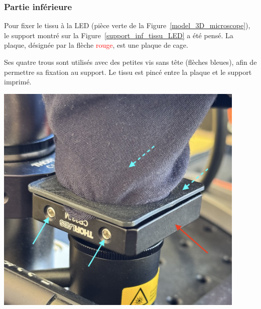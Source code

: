 \subsubsection{Partie inférieure}
\begin{minipage}[c]{0.48\textwidth}
    Pour fixer le tissu à la LED (pièce \textcolor[RGB]{70, 170, 70}{verte} de la Figure~\ref{model_3D_microscope}), le support montré sur la Figure~\ref{support_inf_tissu_LED} a été pensé. La plaque, désignée par la flèche \textcolor{red}{rouge}, est une plaque de cage.

    \vspace{1em}
    Ses quatre trous sont utilisés avec des petites vis sans tête (flèches \textcolor[RGB]{115, 210, 210}{bleues}), afin de permettre sa fixation au support. Le tissu est pincé entre la plaque et le support imprimé.
\end{minipage}\hfill
\begin{minipage}[c]{0.48\textwidth}
    \begin{center}
        \includegraphics[width=0.9\textwidth]{assets/figures/Protections_laser/Securite_mecanique/Protection_vers_microscope/support_inf_tissu_LED.jpeg}
    \end{center}
    \label{support_inf_tissu_LED}
\end{minipage}

